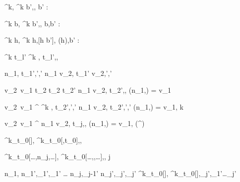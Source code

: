 
  {}
  {\Enter^k\beta,\sigma {} \Update^k b',\sigma,\nothing}
  {b' : \beta}


  {}
  {\Update^k b,\sigma {} \Update^k b',\sigma,\nothing}
  {b,b' : \beta}

  {}
  {\Change^k h,\sigma {} \Change^k h,[h \mapsto b']\sigma,}
  {\sigma(h),b' : \beta}



	{\Select^k   t_{l'}}
	{\Select^k ,\sigma {} t_{l'},\sigma,\nothing}
  {}



  {n_1,\sigma \handle{\iota} t_1',\sigma',\delta'}
  {n_1 \Step v_2,\sigma \handle{\iota} t_1' \Step v_2,\sigma',\delta'}
  {}

	{v_2\ v_1 \evaluate t_2 \Quad
   t_2  t_2'}
  {n_1 \Step v_2,\sigma {} t_2',\sigma,\nothing}
  {\Value(n_1,\sigma) = v_1}

	{v_2\ v_1 \evaluate \Select^\epsilon {} \Quad
   \Select^k ,\sigma {} t_2',\sigma',\delta'}
  {n_1 \Step v_2,\sigma {} t_2',\sigma',\delta'}
  {\Value(n_1,\sigma) = v_1, k }

	{v_2\ v_1 \evaluate \Select^\epsilon {}}
  {n_1 \Step v_2,\sigma {} t_j,\sigma,\nothing}
  {\Value(n_1,\sigma) = v_1, \in \Options(\Select^\epsilon {})}



  {}
  {\Pool^k_{t_0}[],\sigma {} \Pool^k_{t_0}[,t_0],\sigma,\nothing}
  {}

  {}
  {\Pool^k_{t_0}[\ldots,n_j,\ldots],\sigma {} \Pool^k_{t_0}[\ldots,,\ldots],\sigma,\nothing}
  {\each j}

	{n_1,\sigma {} n_1',\sigma_1',\delta_1' \Quad
   \ldots \Quad
   n_j,\sigma_{j-1}'  n_j',\sigma_j',\delta_j'
  }
	{\Pool^k_{t_0}[],\sigma {} \Pool^k_{t_0}[],\sigma_j',\delta_1'\cup\ldots\cup\delta_j'}
  {}




